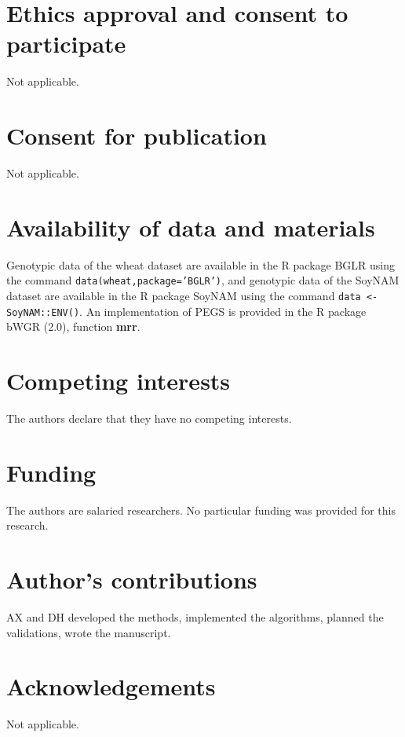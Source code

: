 \documentclass{bmcart}
\begin{document}
\begin{backmatter}

\section*{Ethics approval and consent to participate}
Not applicable.

\section*{Consent for publication}
Not applicable.

\section*{Availability of data and materials}
Genotypic data of the wheat dataset are available in the R package BGLR using the command \texttt{data(wheat,package='BGLR')}, and genotypic data of the SoyNAM dataset are available in the R package SoyNAM using the command \texttt{data <- SoyNAM::ENV()}. An implementation of PEGS is provided in the R package bWGR (2.0), function \textbf{mrr}.

\section*{Competing interests}
The authors declare that they have no competing interests.

\section*{Funding}
The authors are salaried researchers. No particular funding was provided for this research. 

\section*{Author's contributions}
AX and DH developed the methods, implemented the algorithms, planned the validations, wrote the manuscript.

\section*{Acknowledgements}
Not applicable.




\newpage

\end{backmatter}
\end{document}

